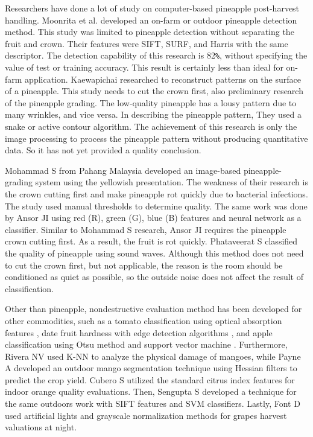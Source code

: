 \documentclass[11pt]{article}
\begin{document}
\begin{linenumbers}
Researchers have done a lot of study on computer-based pineapple post-harvest handling. Moonrita et al. \cite{pineapple-detection-moonrita} developed an on-farm or outdoor pineapple detection method. This study was limited to pineapple detection without separating the fruit and crown. Their features were SIFT, SURF, and Harris with the same descriptor. The detection capability of this research is 82\texttt {\%}, without specifying the value of test or training accuracy. This result is certainly less than ideal for on-farm application. Kaewapichai \cite{pineapple-grading-kaewapichai} researched to reconstruct patterns on the surface of a pineapple. This study needs to cut the crown first, also preliminary research of the pineapple grading. The low-quality pineapple has a lousy pattern due to many wrinkles, and vice versa. In describing the pineapple pattern, They used a snake or active contour algorithm. The achievement of this research is only the image processing to process the pineapple pattern without producing quantitative data. So it has not yet provided a quality conclusion. 

Mohammad S \cite{Mohammad:2011} from Pahang Malaysia developed an image-based pineapple-grading system using the yellowish presentation. The weakness of their research is the crown cutting first and make pineapple rot quickly due to bacterial infections. The study used manual thresholds to determine quality. The same work was done by Ansor JI \cite{anshor:2013} using red (R), green (G), blue (B) features and neural network as a classifier. Similar to Mohammad S research, Ansor JI requires the pineapple crown cutting first. As a result, the fruit is rot quickly. Phataveerat S \cite{Phataveerat:2008} classified the quality of pineapple using sound waves. Although this method does not need to cut the crown first, but not applicable, the reason is the room should be conditioned as quiet as possible, so the outside noise does not affect the result of classification.

Other than pineapple, nondestructive evaluation method has been developed for other commodities, such as a tomato classification using optical absorption features \cite{Zhu:2015}, date fruit hardness with edge detection algorithms \cite{Manickavasagan:2013}, and apple classification using Otsu method and support vector machine \cite{Mizushima:2013}. Furthermore, Rivera NV \cite{Rivera:2014} used K-NN to analyze the physical damage of mangoes, while Payne A \cite{Payne:2014} developed an outdoor mango segmentation technique using Hessian filters to predict the crop yield. Cubero S \cite{Cubero:2014} utilized the standard citrus index features for indoor orange quality evaluations. Then, Sengupta S \cite{Sengupta:2014} developed a technique for the same outdoors work with SIFT features and SVM classifiers. Lastly, Font D \cite{Font:2014} used artificial lights and grayscale normalization methods for grapes harvest valuations at night.


\end{linenumbers}
\end{document}
